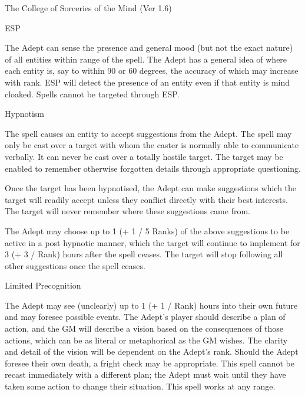 \begin{Chapter}{The College of Sorceries of the Mind (Ver 1.6)}
\begin{spell}[G-4]{ESP}

\begin{effects}
The Adept can sense the presence and general mood (but not the exact
nature) of all entities within range of the spell.  The Adept has a
general idea of where each entity is, say to within 90 or 60 degrees,
the accuracy of which may increase with rank.  ESP will detect the
presence of an entity even if that entity is mind cloaked. Spells
cannot be targeted through ESP.
\end{effects}
\end{spell}

\begin{spell}[G-5]{Hypnotism}

\begin{effects}
The spell causes an entity to accept suggestions from the Adept.  The
spell may only be cast over a target with whom the caster is normally
able to communicate verbally.  It can never be cast over a totally
hostile target.  The target may be enabled to remember otherwise
forgotten details through appropriate questioning.

Once the target has been hypnotised, the Adept can make suggestions
which the target will readily accept unless they conflict directly
with their best interests.  The target will never remember where these
suggestions came from.

The Adept may choose up to 1 (+ 1 / 5 Ranks) of the above suggestions
to be active in a post hypnotic manner, which the target will continue
to implement for 3 (+ 3 / Rank) hours after the spell ceases.  The
target will stop following all other suggestions once the spell
ceases.
\end{effects}
\end{spell}

\begin{spell}[G-6]{Limited Precognition}

\begin{effects}
The Adept may see (unclearly) up to 1 (+ 1 / Rank) hours into their
own future and may foresee possible events.  The Adept’s player should
describe a plan of action, and the GM will describe a vision based on
the consequences of those actions, which can be as literal or
metaphorical as the GM wishes. The clarity and detail of the vision
will be dependent on the Adept’s rank.  Should the Adept foresee their
own death, a fright check may be appropriate. This spell cannot be
recast immediately with a different plan; the Adept must wait until
they have taken some action to change their situation. This spell
works at any range.
\end{effects}
\end{spell}


\end{Chapter}
